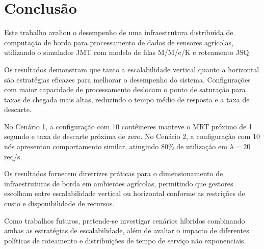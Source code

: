 \documentclass[conference]{IEEEtran}
\begin{document}
\section{Conclusão}

Este trabalho avaliou o desempenho de uma infraestrutura distribuída de computação de borda para processamento de dados de sensores agrícolas, utilizando o simulador JMT com modelo de filas M/M/c/K e roteamento JSQ.

Os resultados demonstram que tanto a escalabilidade vertical quanto a horizontal são estratégias eficazes para melhorar o desempenho do sistema. Configurações com maior capacidade de processamento deslocam o ponto de saturação para taxas de chegada mais altas, reduzindo o tempo médio de resposta e a taxa de descarte.

No Cenário 1, a configuração com 10 contêineres manteve o MRT próximo de 1 segundo e taxa de descarte próxima de zero. No Cenário 2, a configuração com 10 nós apresentou comportamento similar, atingindo 80\% de utilização em $\lambda = 20$ req/s.

Os resultados fornecem diretrizes práticas para o dimensionamento de infraestruturas de borda em ambientes agrícolas, permitindo que gestores escolham entre escalabilidade vertical ou horizontal conforme as restrições de custo e disponibilidade de recursos.

Como trabalhos futuros, pretende-se investigar cenários híbridos combinando ambas as estratégias de escalabilidade, além de avaliar o impacto de diferentes políticas de roteamento e distribuições de tempo de serviço não exponenciais.





\end{document}
